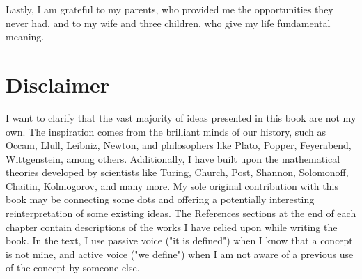 Lastly, I am grateful to my parents, who provided me the opportunities they never had, and to my wife and three children, who give my life fundamental meaning.

%
%

\section*{Disclaimer}

I want to clarify that the vast majority of ideas presented in this book are not my own. The inspiration comes from the brilliant minds of our history, such as Occam, Llull, Leibniz, Newton, and philosophers like Plato, Popper, Feyerabend, Wittgenstein, among others. Additionally, I have built upon the mathematical theories developed by scientists like Turing, Church, Post, Shannon, Solomonoff, Chaitin, Kolmogorov, and many more. My sole original contribution with this book may be connecting some dots and offering a potentially interesting reinterpretation of some existing ideas. The References sections at the end of each chapter contain descriptions of the works I have relied upon while writing the book. In the text, I use passive voice ("it is defined") when I know that a concept is not mine, and active voice ("we define") when I am not aware of a previous use of the concept by someone else.

